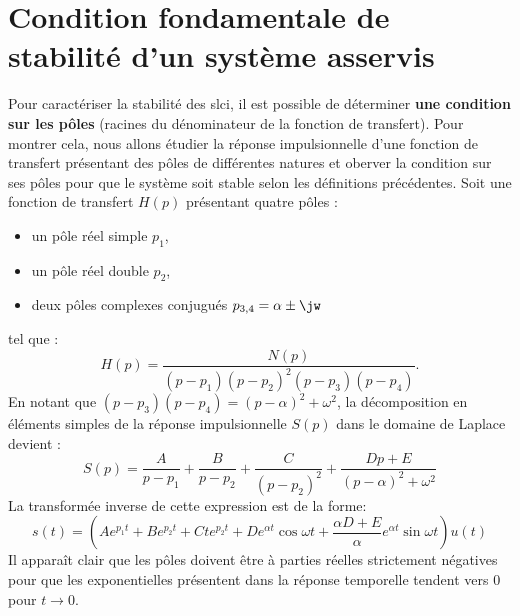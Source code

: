 \section[Condition fondamentale de stabilité]
{Condition fondamentale de stabilité d'un système asservis}
Pour caractériser la stabilité des \gls{slci}, il est possible de déterminer
\textbf{une condition sur les pôles} (racines du dénominateur de la fonction de 
transfert). Pour montrer cela, nous allons étudier la réponse impulsionnelle 
d'une fonction de transfert présentant des pôles de différentes natures et 
oberver la condition sur ses pôles pour que le système soit stable selon les 
définitions précédentes. 
Soit une fonction de transfert $H(p)$ présentant quatre pôles :
\begin{itemize}
    \item un pôle réel simple $p_1$,
    \item un pôle réel double $p_2$,
    \item deux pôles complexes conjugués $p_{3,4}=\alpha\pm\jw$
\end{itemize}
tel que :
\[
    H(p)=\dfrac{N(p)}{(p-p_1)(p-p_2)^2(p-p_3)(p-p_4)}.
\]
En notant que $(p-p_3)(p-p_4)=(p-\alpha)^2+\omega^2$, 
la décomposition en éléments simples de la réponse impulsionnelle $S(p)$ 
dans le domaine de Laplace devient :
\[
    S(p)=\dfrac{A}{p-p_1}
        +\dfrac{B}{p-p_2}
        +\dfrac{C}{(p-p_2)^2}
        +\dfrac{Dp+E}{(p-\alpha)^2+\omega^2}
\]
La transformée inverse de cette expression est de la forme:
\[
    s(t)=\left(Ae^{p_1t}
              +Be^{p_2t}
              +Cte^{p_2t}
              +De^{\alpha t}\cos{\omega t}
              +\dfrac{\alpha D+E}{\alpha}e^{\alpha t}\sin{\omega t}\right)u(t)
\]
Il apparaît clair que les pôles doivent être à parties réelles strictement 
négatives pour que les exponentielles présentent dans la réponse temporelle
tendent vers 0 pour $t\to0$.
\clearpage
\thispagestyle{empty}
